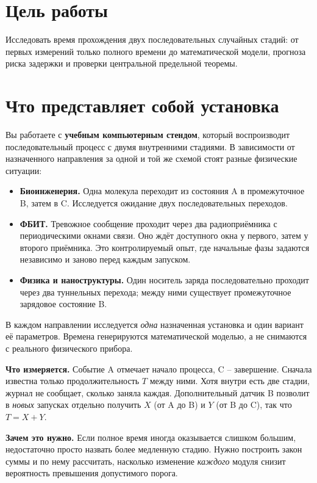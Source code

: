\documentclass[12pt,a4paper]{article}
\begin{document}
\linespread{1.055}\selectfont
\setlength{\parskip}{3pt}
\thispagestyle{firstpage}

\section*{Цель работы}
Исследовать время прохождения двух последовательных случайных стадий: от первых измерений только полного времени до математической модели, прогноза риска задержки и проверки центральной предельной теоремы.

\section*{Что представляет собой установка}
Вы работаете с \textbf{учебным компьютерным стендом}, который воспроизводит последовательный процесс с двумя внутренними стадиями. В зависимости от назначенного направления за одной и той же схемой стоят разные физические ситуации:
\begin{itemize}[topsep=4pt,itemsep=3pt]
\item \textbf{Биоинженерия.} Одна молекула переходит из состояния A в промежуточное B, затем в C. Исследуется ожидание двух последовательных переходов.
\item \textbf{ФБИТ.} Тревожное сообщение проходит через два радиоприёмника с периодическими окнами связи. Оно ждёт доступного окна у первого, затем у второго приёмника. Это контролируемый опыт, где начальные фазы задаются независимо и заново перед каждым запуском.
\item \textbf{Физика и наноструктуры.} Один носитель заряда последовательно проходит через два туннельных перехода; между ними существует промежуточное зарядовое состояние B.
\end{itemize}
В каждом направлении исследуется \emph{одна} назначенная установка и один вариант её параметров. Времена генерируются математической моделью, а не снимаются с реального физического прибора.

\noindent\textbf{Что измеряется.} Событие A отмечает начало процесса, C -- завершение. Сначала известна только продолжительность $T$ между ними. Хотя внутри есть две стадии, журнал не сообщает, сколько заняла каждая. Дополнительный датчик B позволит в \emph{новых} запусках отдельно получить $X$ (от A до B) и $Y$ (от B до C), так что $T=X+Y$.

\noindent\textbf{Зачем это нужно.} Если полное время иногда оказывается слишком большим, недостаточно просто назвать более медленную стадию. Нужно построить закон суммы и по нему рассчитать, насколько изменение \emph{каждого} модуля снизит вероятность превышения допустимого порога.
\end{document}

